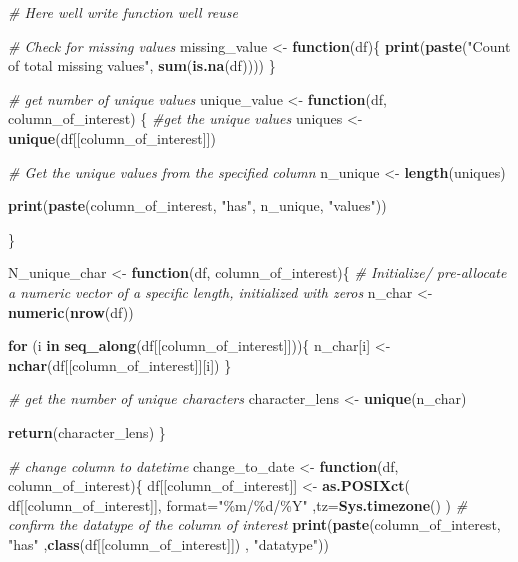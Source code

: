 \documentclass[
]{article}
\newenvironment{Shaded}{\begin{snugshade}}{\end{snugshade}}
\newcommand{\AttributeTok}[1]{\textcolor[rgb]{0.13,0.29,0.53}{#1}}
\newcommand{\CommentTok}[1]{\textcolor[rgb]{0.56,0.35,0.01}{\textit{#1}}}
\newcommand{\ControlFlowTok}[1]{\textcolor[rgb]{0.13,0.29,0.53}{\textbf{#1}}}
\newcommand{\FunctionTok}[1]{\textcolor[rgb]{0.13,0.29,0.53}{\textbf{#1}}}
\newcommand{\NormalTok}[1]{#1}
\newcommand{\OtherTok}[1]{\textcolor[rgb]{0.56,0.35,0.01}{#1}}
\newcommand{\StringTok}[1]{\textcolor[rgb]{0.31,0.60,0.02}{#1}}
\begin{document}
\begin{Shaded}
\begin{Highlighting}[]
\CommentTok{\# Here we\textquotesingle{}ll write function we\textquotesingle{}ll reuse}

\CommentTok{\# Check for missing values}
\NormalTok{missing\_value }\OtherTok{\textless{}{-}} \ControlFlowTok{function}\NormalTok{(df)\{}
  \FunctionTok{print}\NormalTok{(}\FunctionTok{paste}\NormalTok{(}\StringTok{"Count of total missing values"}\NormalTok{, }\FunctionTok{sum}\NormalTok{(}\FunctionTok{is.na}\NormalTok{(df))))}
\NormalTok{\}}


\CommentTok{\# get number of unique values}
\NormalTok{unique\_value }\OtherTok{\textless{}{-}} \ControlFlowTok{function}\NormalTok{(df, column\_of\_interest) \{}
  \CommentTok{\#get the unique values}
\NormalTok{  uniques }\OtherTok{\textless{}{-}} \FunctionTok{unique}\NormalTok{(df[[column\_of\_interest]])}
  
  \CommentTok{\# Get the unique values from the specified column}
\NormalTok{  n\_unique }\OtherTok{\textless{}{-}} \FunctionTok{length}\NormalTok{(uniques)}
  
  \FunctionTok{print}\NormalTok{(}\FunctionTok{paste}\NormalTok{(column\_of\_interest, }\StringTok{"has"}\NormalTok{,  n\_unique, }\StringTok{"values"}\NormalTok{))}
  
\NormalTok{\}}



\NormalTok{N\_unique\_char }\OtherTok{\textless{}{-}} \ControlFlowTok{function}\NormalTok{(df, column\_of\_interest)\{}
  \CommentTok{\# Initialize/ pre{-}allocate a numeric vector of a specific length, initialized with   zeros}
\NormalTok{  n\_char }\OtherTok{\textless{}{-}} \FunctionTok{numeric}\NormalTok{(}\FunctionTok{nrow}\NormalTok{(df)) }
  
  \ControlFlowTok{for}\NormalTok{ (i }\ControlFlowTok{in} \FunctionTok{seq\_along}\NormalTok{(df[[column\_of\_interest]]))\{}
\NormalTok{    n\_char[i] }\OtherTok{\textless{}{-}} \FunctionTok{nchar}\NormalTok{(df[[column\_of\_interest]][i])}
\NormalTok{  \}}
  
  \CommentTok{\# get the number of unique characters}
\NormalTok{  character\_lens }\OtherTok{\textless{}{-}} \FunctionTok{unique}\NormalTok{(n\_char)}
  
  \FunctionTok{return}\NormalTok{(character\_lens)}
\NormalTok{\}}
  

\CommentTok{\# change column to datetime}
\NormalTok{change\_to\_date }\OtherTok{\textless{}{-}} \ControlFlowTok{function}\NormalTok{(df, column\_of\_interest)\{}
\NormalTok{  df[[column\_of\_interest]] }\OtherTok{\textless{}{-}} 
      \FunctionTok{as.POSIXct}\NormalTok{(}
\NormalTok{      df[[column\_of\_interest]],}
      \AttributeTok{format=}\StringTok{"\%m/\%d/\%Y"}\NormalTok{ ,}\AttributeTok{tz=}\FunctionTok{Sys.timezone}\NormalTok{()}
\NormalTok{      )}
  \CommentTok{\# confirm the datatype of the column of interest}
  \FunctionTok{print}\NormalTok{(}\FunctionTok{paste}\NormalTok{(column\_of\_interest, }\StringTok{"has"}\NormalTok{ ,}\FunctionTok{class}\NormalTok{(df[[column\_of\_interest]]) , }\StringTok{"datatype"}\NormalTok{))}
  

\end{Highlighting}
\end{Shaded}
\end{document}
